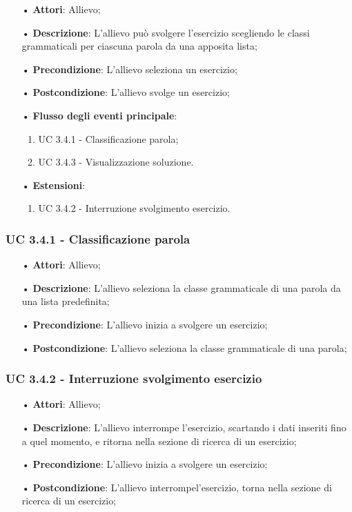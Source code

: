 \begin{itemize}
\item[•]\textbf{Attori}: Allievo;
\item[•]\textbf{Descrizione}: L'allievo può svolgere l'esercizio scegliendo le classi grammaticali per ciascuna parola da una apposita lista;
\item[•]\textbf{Precondizione}: L'allievo seleziona un esercizio;
\item[•]\textbf{Postcondizione}: L'allievo svolge un esercizio;
\item[•]\textbf{Flusso degli eventi principale}:
\begin{enumerate}
\item UC 3.4.1 - Classificazione parola;
\item UC 3.4.3 - Visualizzazione soluzione.  %
\end{enumerate}
\item[•]\textbf{Estensioni}:
\begin{enumerate}
\item UC 3.4.2 - Interruzione svolgimento esercizio.
\end{enumerate}
\end{itemize}

\subsubsection{UC 3.4.1 - Classificazione parola}
\begin{itemize}
\item[•]\textbf{Attori}: Allievo;
\item[•]\textbf{Descrizione}: L'allievo seleziona la classe grammaticale di una parola da una lista predefinita;
\item[•]\textbf{Precondizione}: L'allievo inizia a svolgere un esercizio;
\item[•]\textbf{Postcondizione}: L'allievo seleziona la classe grammaticale di una parola;
\end{itemize}

\subsubsection{UC 3.4.2 - Interruzione svolgimento esercizio}
\begin{itemize}
\item[•]\textbf{Attori}: Allievo;
\item[•]\textbf{Descrizione}: L'allievo interrompe  l'esercizio, scartando i dati inseriti fino a quel momento, e ritorna nella sezione di ricerca di un esercizio;
\item[•]\textbf{Precondizione}: L'allievo inizia a svolgere un esercizio;
\item[•]\textbf{Postcondizione}: L'allievo interrompel'esercizio, torna nella sezione di ricerca di un esercizio;
\end{itemize}

